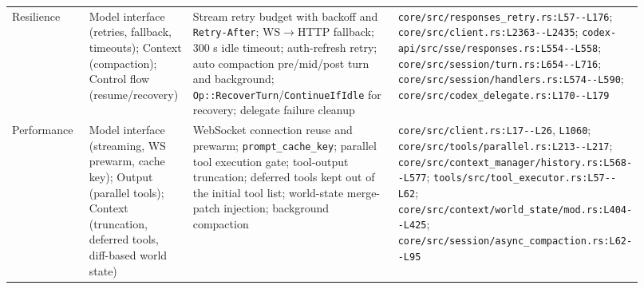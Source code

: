 \begin{longtable}{@{}p{0.13\linewidth}p{0.17\linewidth}p{0.36\linewidth}p{0.26\linewidth}@{}}
Resilience & Model interface (retries, fallback, timeouts); Context (compaction); Control flow (resume/recovery) & Stream retry budget with backoff and \texttt{Retry-\allowbreak{}After}; WS$\rightarrow$HTTP fallback; 300 s idle timeout; auth-refresh retry; auto compaction pre/mid/post turn and background; \texttt{Op:\allowbreak{}:\allowbreak{}RecoverTurn}/\texttt{ContinueIfIdle} for recovery; delegate failure cleanup & \texttt{core/\allowbreak{}src/\allowbreak{}responses\_\allowbreak{}retry.\allowbreak{}rs:\allowbreak{}L57-\allowbreak{}-\allowbreak{}L176}; \texttt{core/\allowbreak{}src/\allowbreak{}client.\allowbreak{}rs:\allowbreak{}L2363-\allowbreak{}-\allowbreak{}L2435}; \texttt{codex-\allowbreak{}api/\allowbreak{}src/\allowbreak{}sse/\allowbreak{}responses.\allowbreak{}rs:\allowbreak{}L554-\allowbreak{}-\allowbreak{}L558}; \texttt{core/\allowbreak{}src/\allowbreak{}session/\allowbreak{}turn.\allowbreak{}rs:\allowbreak{}L654-\allowbreak{}-\allowbreak{}L716}; \texttt{core/\allowbreak{}src/\allowbreak{}session/\allowbreak{}handlers.\allowbreak{}rs:\allowbreak{}L574-\allowbreak{}-\allowbreak{}L590}; \texttt{core/\allowbreak{}src/\allowbreak{}codex\_\allowbreak{}delegate.\allowbreak{}rs:\allowbreak{}L170-\allowbreak{}-\allowbreak{}L179} \\
Performance & Model interface (streaming, WS prewarm, cache key); Output (parallel tools); Context (truncation, deferred tools, diff-based world state) & WebSocket connection reuse and prewarm; \texttt{prompt\_\allowbreak{}cache\_\allowbreak{}key}; parallel tool execution gate; tool-output truncation; deferred tools kept out of the initial tool list; world-state merge-patch injection; background compaction & \texttt{core/\allowbreak{}src/\allowbreak{}client.\allowbreak{}rs:\allowbreak{}L17-\allowbreak{}-\allowbreak{}L26}, \texttt{L1060}; \texttt{core/\allowbreak{}src/\allowbreak{}tools/\allowbreak{}parallel.\allowbreak{}rs:\allowbreak{}L213-\allowbreak{}-\allowbreak{}L217}; \texttt{core/\allowbreak{}src/\allowbreak{}context\_\allowbreak{}manager/\allowbreak{}history.\allowbreak{}rs:\allowbreak{}L568-\allowbreak{}-\allowbreak{}L577}; \texttt{tools/\allowbreak{}src/\allowbreak{}tool\_\allowbreak{}executor.\allowbreak{}rs:\allowbreak{}L57-\allowbreak{}-\allowbreak{}L62}; \texttt{core/\allowbreak{}src/\allowbreak{}context/\allowbreak{}world\_\allowbreak{}state/\allowbreak{}mod.\allowbreak{}rs:\allowbreak{}L404-\allowbreak{}-\allowbreak{}L425}; \texttt{core/\allowbreak{}src/\allowbreak{}session/\allowbreak{}async\_\allowbreak{}compaction.\allowbreak{}rs:\allowbreak{}L62-\allowbreak{}-\allowbreak{}L95} \\

\end{longtable}
